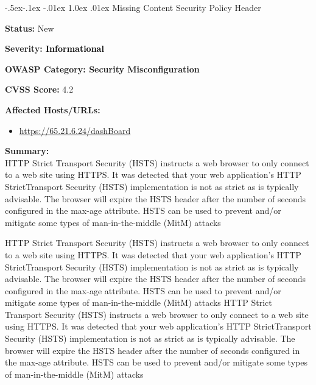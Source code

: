 \documentclass{article}
\makeatletter
\renewcommand{\subsection}{\@startsection{subsection}{2}{\z@}%
            {-.5ex\@plus -.1ex \@minus -.01ex}%
            {1.0ex \@plus .01ex}%
            {\normalfont\large\color{subsectioncolor}}}
\makeatother
\begin{document}
                \newpage
                \subsection{\large Missing Content Security Policy Header}
                \begin{description}[itemsep=2pt, leftmargin=0.2cm]
                    \item \large \textbf{Status:} New
                    \item \large \textbf{Severity: \textcolor{infotext} {Informational}}
                    \item \large \textbf{OWASP Category: Security Misconfiguration}
                    \item \large \textbf{CVSS Score:} 4.2 
                    \item \large \textbf{Affected Hosts/URLs:}
                           \begin{itemize} 
                           \item \large \href{https://65.21.6.24/dashBoard} {https://65.21.6.24/dashBoard}
                           \end{itemize}
                    \item \large \textbf{Summary:} \\  HTTP Strict Transport Security (HSTS) instructs a web browser to only connect to a web site using HTTPS. It was detected that your web application's HTTP StrictTransport Security (HSTS) implementation is not as strict as is typically advisable.
 The browser will expire the HSTS header after the number of seconds configured in the max-age attribute. HSTS can be used to prevent and/or mitigate some types of man-in-the-middle (MitM) attacks 

HTTP Strict Transport Security (HSTS) instructs a web browser to only connect to a web site using HTTPS. It was detected that your web application's HTTP StrictTransport Security (HSTS) implementation is not as strict as is typically advisable.
 The browser will expire the HSTS header after the number of seconds configured in the max-age attribute. HSTS can be used to prevent and/or mitigate some types of man-in-the-middle (MitM) attacks 
HTTP Strict Transport Security (HSTS) instructs a web browser to only connect to a web site using HTTPS. It was detected that your web application's HTTP StrictTransport Security (HSTS) implementation is not as strict as is typically advisable.
 The browser will expire the HSTS header after the number of seconds configured in the max-age attribute. HSTS can be used to prevent and/or mitigate some types of man-in-the-middle (MitM) attacks 


\end{description}
\end{document}
